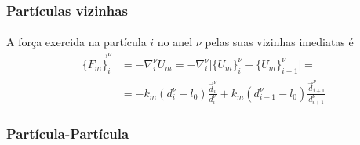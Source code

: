 \documentclass{article}
\theoremstyle{definition}
\def \quantity#1#2#3{\vec{#1}_{#2}^{#3}}
\def \quantitysc#1#2#3{{#1}_{#2}^{#3}}
\def \desloc#1#2{\quantity{d}{#1}{#2}}
\def \deslocsc#1#2{\quantitysc{d}{#1}{#2}}
\begin{document}
\subsubsection{Partículas vizinhas}
\paragraph{}
A força exercida na partícula $i$ no anel $\nu$ pelas suas vizinhas imediatas é
\begin{equation}
\begin{aligned}
    \quantity{\{F_m\}}{i}{\nu} &= -\quantitysc{\nabla}{i}{\nu}U_m = -\quantitysc{\nabla}{i}{\nu}\bigg[\quantitysc{\{U_m\}}{i}{\nu} + \quantitysc{\{U_m\}}{i+1}{\nu} \bigg] = \\ 
    &= -k_m (\deslocsc{i}{\nu} -l_0)\frac{\desloc{i}{\nu}}{\deslocsc{i}{\nu}} + k_m (\deslocsc{i+1}{\nu} -l_0)\frac{\desloc{i+1}{\nu}}{\deslocsc{i+1}{\nu}}
\end{aligned}
\label{eq:force_spring}
\end{equation}

\subsubsection{Partícula-Partícula}
\end{document}
